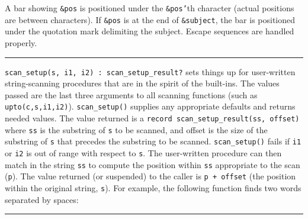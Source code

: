 A bar showing \texttt{\&pos} is positioned under the
\texttt{\&pos'}th character (actual positions are
between characters). If \texttt{\&pos} is at the end of
\texttt{\&subject}, the bar is positioned under the quotation mark
delimiting the subject. Escape sequences are handled properly. 



\vspace{0.25cm}\hrule{}

\texttt{scan\_setup(s, i1, i2) : scan\_setup\_result?} sets things up
for user-written string-scanning procedures that are in the spirit of
the built-ins. The values passed are the last three
arguments to all scanning functions (such as
\texttt{upto(c,s,i1,i2)}). \texttt{scan\_setup()} supplies any
appropriate defaults and returns needed values. The value returned is a
\texttt{record scan\_setup\_result(ss, offset)}
where \texttt{ss} is the substring of \texttt{s} to be scanned, and
offset is the size of the substring of \texttt{s} that precedes the
substring to be scanned. \texttt{scan\_setup()} fails if \texttt{i1} or
\texttt{i2} is out of range with respect to \texttt{s}. The
user-written procedure can then match in the string \texttt{ss} to
compute the position within \texttt{ss} appropriate to the scan
(\texttt{p}). The value returned (or suspended) to the caller is
\texttt{p + offset} (the position within the original string,
\texttt{s}). For example, the following function finds two words
separated by spaces:


\vspace{0.25cm}\hrule{}

